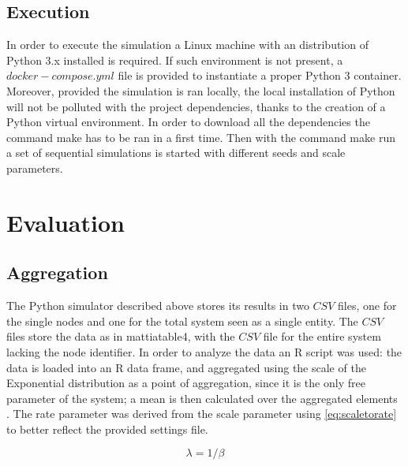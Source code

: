 \documentclass[conference]{IEEEtran}
\begin{document}
\subsection{Execution}\label{sec:execution}
In order to execute the simulation a Linux machine with an distribution of Python 3.x installed is required. If such environment is not present, a \(docker-compose.yml\) file is provided to instantiate a proper Python 3 container. Moreover, provided the simulation is ran locally, the local installation of Python will not be polluted with the project dependencies, thanks to the creation of a Python virtual environment. In order to download all the dependencies the command make has to be ran in a first time. Then with the command make run a set of sequential simulations is started with different seeds and scale parameters.

\section{Evaluation}\label{sec:evaluation}

\subsection{Aggregation}\label{sec:aggragation}
The Python simulator described above stores its results in two \(CSV\) files, one for the single nodes and one for the total system seen as a single entity. The \(CSV\) files store the data as in mattiatable4, with the \(CSV\) file for the entire system lacking the node identifier. In order to analyze the data an R script was used: the data is loaded into an R data frame, and aggregated using the scale of the Exponential distribution as a point of aggregation, since it is the only free parameter of the system; a mean is then calculated over the aggregated elements . The rate parameter was derived from the scale parameter using \cref{eq:scaletorate} to better reflect the provided settings file. 

\begin{equation}
    \lambda=1/\beta\label{eq:scaletorate}
\end{equation}
\end{document}
